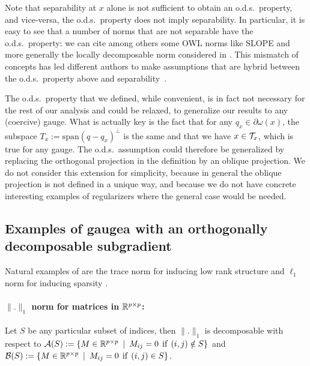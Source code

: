 \documentclass{article}
\begin{document}
Note that separability at $x$ alone is not sufficient to obtain an o.d.s.\ property, and vice-versa, the o.d.s.\ property does not imply separability. In particular, it is easy to see that a number of norms that are not separable have the o.d.s.\ property: we can cite among others some OWL norms like SLOPE and more generally the locally decomposable norm considered in \citet{obozinski2016unified}. This mismatch of concepts has led different authors to make assumptions that are hybrid between the o.d.s.\ property above and separability~\citep{candes2013simple,fadili2013stable,vaiter2015model}.

The o.d.s.\ property that we defined, while convenient, is in fact not necessary for the rest of our analysis and could be relaxed, to generalize our results to any (coercive) gauge. What is actually key is the fact that for any $q_x \in \partial \omega(x)$, the subspace $T_x:=\text{span}(q-q_x)^{\bot}$ is the same and that we have $x \in \mathcal{T}_x$, which is true for any gauge. 
The o.d.s.\ assumption could therefore be generalized by replacing the orthogonal projection in the definition by an oblique projection. We do not consider this extension for simplicity, because in general the oblique projection is not defined in a unique way, and because we do not have concrete interesting examples of regularizers where the general case would be needed. 




\subsection{Examples of gaugea with an orthogonally decomposable subgradient}

Natural examples of are the trace norm for inducing low rank structure and $\ell_1$ norm for inducing sparsity .\\

\paragraph{$\|.\|_1$ norm for matrices in $\mathbb{R}^{p\times p}$: } Let $S$ be any particular subset of indices, then $\|.\|_1$ is decomposable with respect to $\mathcal{A}(S):=\left\lbrace M\in\mathbb{R}^{p\times p} \enskip | \enskip M_{ij}=0\:\: \text{if} \:\: (i,j) \notin S\right\rbrace$ and $\mathcal{B}(S):=\left\lbrace M\in\mathbb{R}^{p\times p} \enskip | \enskip M_{ij}=0 \:\: \text{if} \:\: (i,j) \in S\right\rbrace$.
\end{document}
